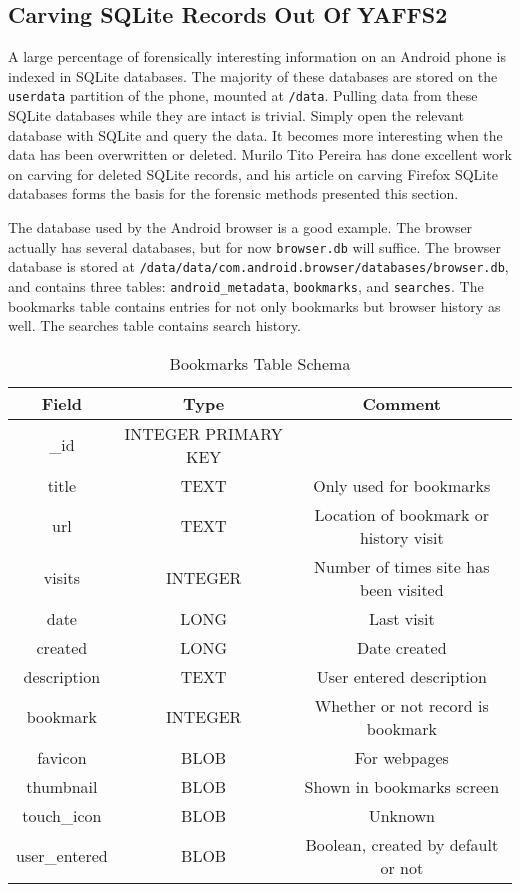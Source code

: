 \subsection{Carving SQLite Records Out Of YAFFS2}
A large percentage of forensically interesting information on an Android phone is indexed in SQLite databases.  The majority of
these databases are stored on the \texttt{userdata} partition of the phone, mounted at \texttt{/data}.  Pulling data from these
SQLite databases while they are intact is trivial.  Simply open the relevant database with SQLite and query the data.  It becomes
more interesting when the data has been overwritten or deleted.  Murilo Tito Pereira has done excellent work on carving for deleted
SQLite records, and his article on carving Firefox SQLite databases forms the basis for the forensic methods presented this section.
\cite{carvefirefox}

The database used by the Android browser is a good example. The browser actually has several databases, but for now
\texttt{browser.db} will suffice. The browser database is stored at \texttt{/data/data/com.android.browser/databases/browser.db},
and contains three tables: \texttt{android\_metadata}, \texttt{bookmarks}, and \texttt{searches}.  The bookmarks table contains
entries for not only bookmarks but browser history as well.  The searches table contains search history. 

\begin{table}
\begin {center}
	\begin{tabular}{| c | c | c |}
	\hline
	Field & Type & Comment \\
	\hline
	\_id & INTEGER PRIMARY KEY & \\
	title & TEXT  &  Only used for bookmarks \\
	url & TEXT  & Location of bookmark or history visit \\
	visits & INTEGER  & Number of times site has been visited \\
	date & LONG  &  Last visit \\
	created & LONG &  Date created \\
	description & TEXT &  User entered description \\
	bookmark & INTEGER & Whether or not record is bookmark \\
	favicon & BLOB &  For webpages \\
	thumbnail & BLOB &  Shown in bookmarks screen \\
	touch\_icon & BLOB &  Unknown \\
	user\_entered & BLOB & Boolean, created by default or not \\
	\hline
	\end{tabular}
\end{center}
	\caption{Bookmarks Table Schema}
	\label{tab:bookmarkschema}
\end{table}

